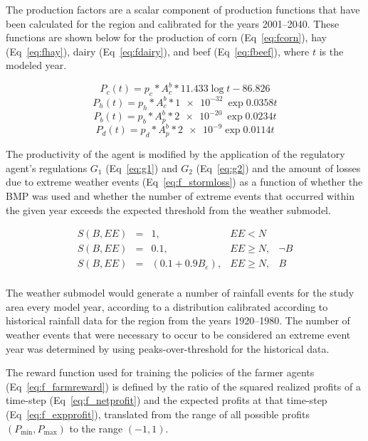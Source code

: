 The production factors are a scalar component of production
functions that have been calculated for the region and
calibrated for the years 2001--2040.
These functions are shown below for the production of corn (Eq~\ref{eq:fcorn}),
hay (Eq~\ref{eq:fhay}),
dairy (Eq~\ref{eq:fdairy}),
and beef (Eq~\ref{eq:fbeef}),
where $t$ is the modeled year.

\begin{equation}
\label{eq:fcorn}
    P_c(t) = p_c * A_c^b * 11.433\log{t} - 86.826
\end{equation}
\begin{equation}
\label{eq:fhay}
    P_h(t) = p_h * A_c^b * \SI{1e-32}{}\exp{0.0358t}
\end{equation}
\begin{equation}
\label{eq:fbeef}
    P_b(t) = p_b * A_p^b * \SI{2e-20}{}\exp{0.0234t}
\end{equation}
\begin{equation}
\label{eq:fdairy}
    P_d(t) = p_d * A_p^b * \SI{2e-9}\exp{0.0114t}
\end{equation}

The productivity of the agent is modified by
the application of the regulatory agent's regulations $G_1$ (Eq~\ref{eq:g1}) 
and $G_2$ (Eq~\ref{eq:g2})
and the amount of losses due to extreme weather events (Eq~\ref{eq:f_stormloss})
as a function of whether the BMP was used and whether the number
of extreme events that occurred within the given year exceeds the
expected threshold from the weather submodel.

\begin{equation}
\label{eq:f_stormloss}
\begin{array}{lllll}
    S(B, EE) & = & 1, & EE < N & \\
    S(B, EE) & = & 0.1, & EE \ge N, & \neg B \\
    S(B, EE) & = & (0.1 + 0.9 B_e), & EE \ge N, & B \\
\end{array} 
\end{equation}

The weather submodel would generate a number of rainfall events
for the study area every model year, according to a distribution
calibrated according to historical rainfall data for the region
from the years 1920--1980.
The number of weather events that were necessary to occur to
be considered an extreme event year was determined by
using peaks-over-threshold for the historical data. 

The reward function used for training the policies of the
farmer agents (Eq~\ref{eq:f_farmreward})
is defined by the ratio of the squared 
realized profits of a time-step (Eq~\ref{eq:f_netprofit})
and the expected profits at that time-step (Eq~\ref{eq:f_expprofit}),
translated from the range of all possible profits $(P_{\min}, P_{\max})$
to the range $(-1, 1)$.

